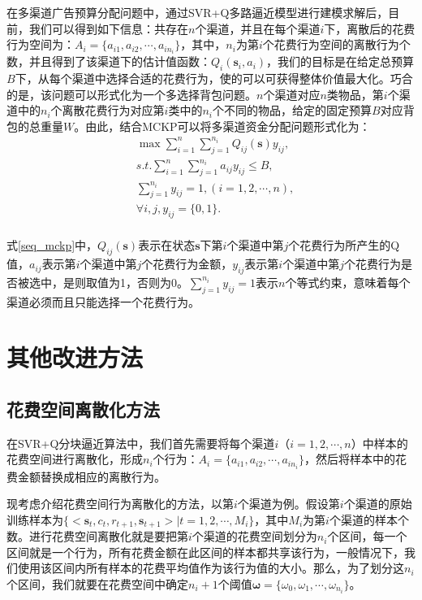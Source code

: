 在多渠道广告预算分配问题中，通过SVR+Q多路逼近模型进行建模求解后，目前，我们可以得到如下信息：共存在$n$个渠道，并且在每个渠道$i$下，离散后的花费行为空间为：$A_{i}=\{a_{i1},a_{i2},\cdots,a_{i n_{i}}\}$，其中，$n_{i}$为第$i$个花费行为空间的离散行为个数，并且得到了该渠道下的估计值函数：$Q_{i}(\bm{s}_{i},a_{i})$，我们的目标是在给定总预算$B$下，从每个渠道中选择合适的花费行为，使的可以可获得整体价值最大化。巧合的是，该问题可以形式化为一个多选择背包问题。$n$个渠道对应$n$类物品，第$i$个渠道中的$n_{i}$个离散花费行为对应第$i$类中的$n_{i}$个不同的物品，给定的固定预算$B$对应背包的总重量$W$。由此，结合MCKP可以将多渠道资金分配问题形式化为：
\begin{equation}\label{seq_mckp}
\begin{split}
&\max \sum_{i=1}^{n}\sum_{j=1}^{n_{i}}Q_{ij}(\bm{s})y_{ij},\\
&s.t. \sum_{i=1}^{n}\sum_{j=1}^{n_{i}}a_{ij}y_{ij} \leqslant B,\\
&\sum_{j=1}^{n_{i}}y_{ij}=1,(i=1,2,\cdots,n),\\
&\forall i,j, y_{ij}=\{0,1\}.\\
\end{split}
\end{equation}

式\eqref{seq_mckp}中，$Q_{ij}(\bm{s})$表示在状态$\bm{s}$下第$i$个渠道中第$j$个花费行为所产生的Q值，$a_{ij}$表示第$i$个渠道中第$j$个花费行为金额，$y_{ij}$表示第$i$个渠道中第$j$个花费行为是否被选中，是则取值为1，否则为0。$\sum_{j=1}^{n_{i}}y_{ij}=1$表示$n$个等式约束，意味着每个渠道必须而且只能选择一个花费行为。

\section{其他改进方法}

\subsection{花费空间离散化方法}
在SVR+Q分块逼近算法中，我们首先需要将每个渠道$i$（$i=1,2,\cdots,n$）中样本的花费空间进行离散化，形成$n_{i}$个行为$：A_{i}=\{a_{i1},a_{i2},\cdots,a_{i n_{i}}\}$，然后将样本中的花费金额替换成相应的离散行为。

现考虑介绍花费空间行为离散化的方法，以第$i$个渠道为例。假设第$i$个渠道的原始训练样本为$\{<\mathbf{s}_{t},c_{t},r_{t+1},\mathbf{s}_{t+1}>|t=1,2,\cdots,M_{i}\}$，其中$M_{i}$为第$i$个渠道的样本个数。进行花费空间离散化就是要把第$i$个渠道的花费空间划分为$n_{i}$个区间，每一个区间就是一个行为，所有花费金额在此区间的样本都共享该行为，一般情况下，我们使用该区间内所有样本的花费平均值作为该行为值的大小。那么，为了划分这$n_{i}$个区间，我们就要在花费空间中确定$n_{i}+1$个阈值$\bm{\omega}=\{\omega_{0},\omega_{1},\cdots,\omega_{n_{i}}\}$。

